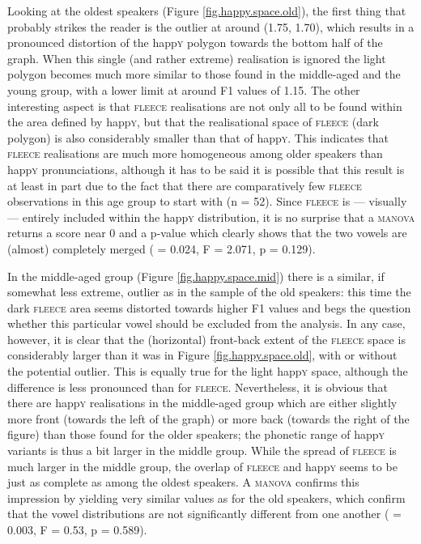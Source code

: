 Looking at the oldest speakers (Figure \ref{fig.happy.space.old}), the first thing that probably strikes the reader is the outlier at around (1.75, 1.70), which results in a pronounced distortion of the happ\textsc{y} polygon towards the bottom half of the graph.
When this single (and rather extreme) realisation is ignored the light polygon becomes much more similar to those found in the middle-aged and the young group, with a lower limit at around F1 values of 1.15.
The other interesting aspect is that \textsc{fleece} realisations are not only all to be found within the area defined by happ\textsc{y}, but that the realisational space of \textsc{fleece} (dark polygon) is also considerably smaller than that of happ\textsc{y}.
This indicates that \textsc{fleece} realisations are much more homogeneous among older speakers than happ\textsc{y} pronunciations, although it has to be said it is possible that this result is at least in part due to the fact that there are comparatively few \textsc{fleece} observations in this age group to start with (n = 52).
Since \textsc{fleece} is --- visually --- entirely included within the happ\textsc{y} distribution, it is no surprise that a \textsc{manova} returns a  score near 0 and a p-value which clearly shows that the two vowels are (almost) completely merged ( = 0.024, F = 2.071, p = 0.129).

In the middle-aged group (Figure \ref{fig.happy.space.mid}) there is a similar, if somewhat less extreme, outlier as in the sample of the old speakers: this time the dark \textsc{fleece} area seems distorted towards higher F1 values and begs the question whether this particular vowel should be excluded from the analysis.
In any case, however, it is clear that the (horizontal) front-back extent of the \textsc{fleece} space is considerably larger than it was in Figure \ref{fig.happy.space.old}, with or without the potential outlier.
This is equally true for the light happ\textsc{y} space, although the difference is less pronounced than for \textsc{fleece}.
Nevertheless, it is obvious that there are happ\textsc{y} realisations in the middle-aged group which are either slightly more front (towards the left of the graph) or more back (towards the right of the figure) than those found for the older speakers; the phonetic range of happ\textsc{y} variants is thus a bit larger in the middle group.
While the spread of \textsc{fleece} is much larger in the middle group, the overlap of \textsc{fleece} and happ\textsc{y} seems to be just as complete as among the oldest speakers.
A \textsc{manova} confirms this impression by yielding very similar values as for the old speakers, which confirm that the vowel distributions are not significantly different from one another ( = 0.003, F = 0.53, p = 0.589).

